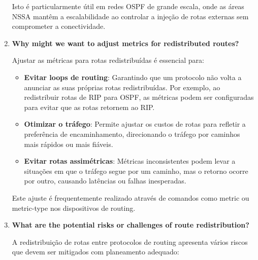 \documentclass[11pt,english, openright, oneside]{book}
\begin{document}
\begin{enumerate}
  Isto é particularmente útil em redes OSPF de grande escala, onde as áreas NSSA mantêm a escalabilidade ao controlar a injeção de rotas externas sem comprometer a conectividade.
  \vspace{0.2cm}

  \item \textbf{Why might we want to adjust metrics for redistributed routes?}
  \vspace{0.2cm}

  \par Ajustar as métricas para rotas redistribuídas é essencial para:
  \vspace{0.2cm}

  \begin{itemize}
    \item \textbf{Evitar loops de routing}: Garantindo que um protocolo não volta a anunciar as suas próprias rotas redistribuídas. Por exemplo, ao redistribuir rotas de RIP para OSPF, as métricas podem ser configuradas para evitar que as rotas retornem ao RIP.
    \item \textbf{Otimizar o tráfego}: Permite ajustar os custos de rotas para refletir a preferência de encaminhamento, direcionando o tráfego por caminhos mais rápidos ou mais fiáveis.
    \item \textbf{Evitar rotas assimétricas}: Métricas inconsistentes podem levar a situações em que o tráfego segue por um caminho, mas o retorno ocorre por outro, causando latências ou falhas inesperadas.
  \end{itemize}
  \vspace{0.2cm}

  Este ajuste é frequentemente realizado através de comandos como metric ou metric-type nos dispositivos de routing.
  \vspace{0.2cm}

  \item \textbf{What are the potential risks or challenges of route redistribution?}
  \vspace{0.2cm}

  \par A redistribuição de rotas entre protocolos de routing apresenta vários riscos que devem ser mitigados com planeamento adequado:
  \vspace{0.2cm}


\end{enumerate}
\end{document}

